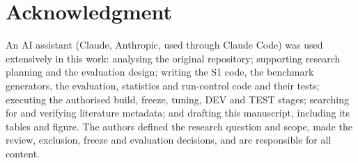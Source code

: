 \documentclass[conference]{IEEEtran}
\begin{document}
\section*{Acknowledgment}
An AI assistant (Claude, Anthropic, used through Claude Code) was used extensively in this
work: analysing the original repository; supporting research planning and the evaluation design; writing the S1 code,
the benchmark generators, the evaluation, statistics and run-control code and their tests; executing the authorised
build, freeze, tuning, DEV and TEST stages; searching for and verifying literature metadata; and drafting this
manuscript, including its tables and figure. The authors defined the research question and scope, made the review,
exclusion, freeze and evaluation decisions, and are responsible for all content.



\end{document}
